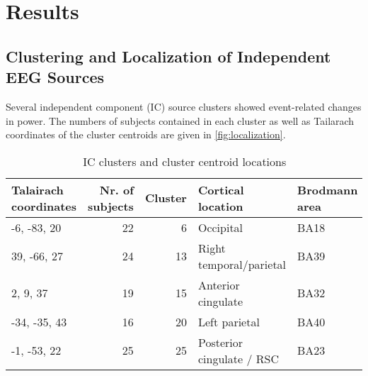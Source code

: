 \section{Results}

\subsection{Clustering and Localization of Independent EEG Sources}
Several independent component (IC) source clusters showed event-related changes in power. The numbers of subjects contained in each cluster as well as Tailarach coordinates of the cluster centroids are given in \ref{fig:localization}.

\begin{table}
\caption{\label{tab:}IC clusters and cluster centroid locations}
\centering
\begin{tabular}[t]{l|r|r|l|l}
\hline
Talairach coordinates & Nr. of subjects & Cluster & Cortical location & Brodmann area\\
\hline
-6, -83, 20 & 22 & 6 & Occipital & BA18\\
\hline
39, -66, 27 & 24 & 13 & Right temporal/parietal & BA39\\
\hline
2, 9, 37 & 19 & 15 & Anterior cingulate & BA32\\
\hline
-34, -35, 43 & 16 & 20 & Left parietal & BA40\\
\hline
-1, -53, 22 & 25 & 25 & Posterior cingulate / RSC & BA23\\
\hline
\end{tabular}
\end{table}

%